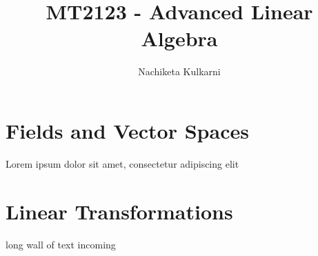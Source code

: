 \documentclass[12pt, oneside]{book}
\date{}
\title{MT2123 - Advanced Linear Algebra}
\author{Nachiketa Kulkarni}
\begin{document}
\maketitle
\tableofcontents

\mainmatter
\chapter{Fields and Vector Spaces}
Lorem ipsum dolor sit amet, consectetur adipiscing elit

\chapter{Linear Transformations}
long wall of text incoming
\end{document}
